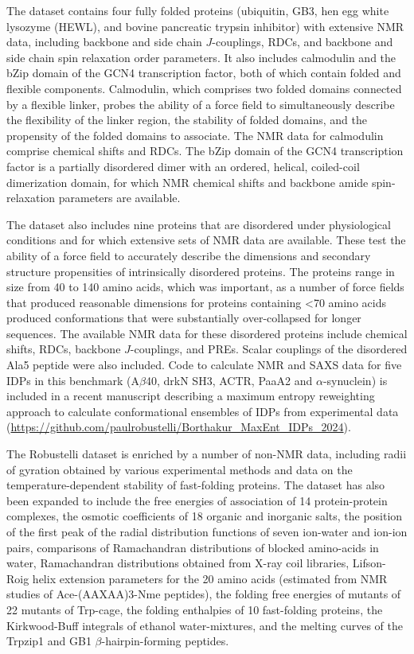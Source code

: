 \documentclass[9pt,review,pubversion]{livecoms}
\begin{document}
The dataset contains four fully folded proteins (ubiquitin, GB3, hen egg white lysozyme (HEWL), and bovine pancreatic trypsin inhibitor) with extensive NMR data, including backbone and side chain $J$-couplings, RDCs, and backbone and side chain spin relaxation order parameters.
It also includes calmodulin and the bZip domain of the GCN4 transcription factor, both of which contain folded and flexible components.
Calmodulin, which comprises two folded domains connected by a flexible linker, probes the ability of a force field to simultaneously describe the flexibility of the linker region, the stability of folded domains, and the propensity of the folded domains to associate.
The NMR data for calmodulin comprise chemical shifts and RDCs.
The bZip domain of the GCN4 transcription factor is a partially disordered dimer with an ordered, helical, coiled-coil dimerization domain, for which NMR chemical shifts and backbone amide spin-relaxation parameters are available. 

The dataset also includes nine proteins that are disordered under physiological conditions and for which extensive sets of NMR data are available.
These test the ability of a force field to accurately describe the dimensions and secondary structure propensities of intrinsically disordered proteins.
The proteins range in size from 40 to 140 amino acids, which was important, as a number of force fields that produced reasonable dimensions for proteins containing <70 amino acids produced conformations that were substantially over-collapsed for longer sequences.
The available NMR data for these disordered proteins include chemical shifts, RDCs, backbone $J$-couplings, and PREs.
Scalar couplings of the disordered Ala5 peptide were also included. 
Code to calculate NMR and SAXS data for five IDPs in this benchmark (A$\beta$40, drkN SH3, ACTR, PaaA2 and $\alpha$-synuclein) is included in a recent manuscript describing a maximum entropy reweighting approach to calculate conformational ensembles of IDPs from experimental data \cite{borthakur_determining_2025} (\url{https://github.com/paulrobustelli/Borthakur_MaxEnt_IDPs_2024}).

The Robustelli dataset is enriched by a number of non-NMR data, including radii of gyration obtained by various experimental methods and data on the temperature-dependent stability of fast-folding proteins.
The dataset has also been expanded \cite{piana_development_2020} to include the free energies of association of 14 protein-protein complexes, the osmotic coefficients of 18 organic and inorganic salts, the position of the first peak of the radial distribution functions of seven ion-water and ion-ion pairs, comparisons of Ramachandran distributions of blocked amino-acids in water, Ramachandran distributions obtained from X-ray coil libraries, Lifson-Roig helix extension parameters for the 20 amino acids (estimated from NMR studies of Ace-(AAXAA)3-Nme peptides), the folding free energies of mutants of 22 mutants of Trp-cage, the folding enthalpies of 10 fast-folding proteins, the Kirkwood-Buff integrals of ethanol water-mixtures, and the melting curves of the Trpzip1 and GB1 $\beta$-hairpin-forming peptides.
\end{document}
